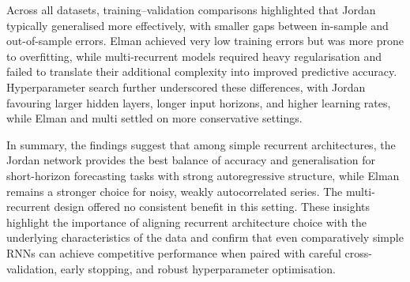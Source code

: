 \documentclass[conference]{IEEEtran}
\begin{document}
Across all datasets, training–validation comparisons highlighted that Jordan typically generalised more effectively, with smaller gaps between in-sample and out-of-sample errors. Elman achieved very low training errors but was more prone to overfitting, while multi-recurrent models required heavy regularisation and failed to translate their additional complexity into improved predictive accuracy. Hyperparameter search further underscored these differences, with Jordan favouring larger hidden layers, longer input horizons, and higher learning rates, while Elman and multi settled on more conservative settings.

In summary, the findings suggest that among simple recurrent architectures, the Jordan network provides the best balance of accuracy and generalisation for short-horizon forecasting tasks with strong autoregressive structure, while Elman remains a stronger choice for noisy, weakly autocorrelated series. The multi-recurrent design offered no consistent benefit in this setting. These insights highlight the importance of aligning recurrent architecture choice with the underlying characteristics of the data and confirm that even comparatively simple RNNs can achieve competitive performance when paired with careful cross-validation, early stopping, and robust hyperparameter optimisation.





\onecolumn
\end{document}

